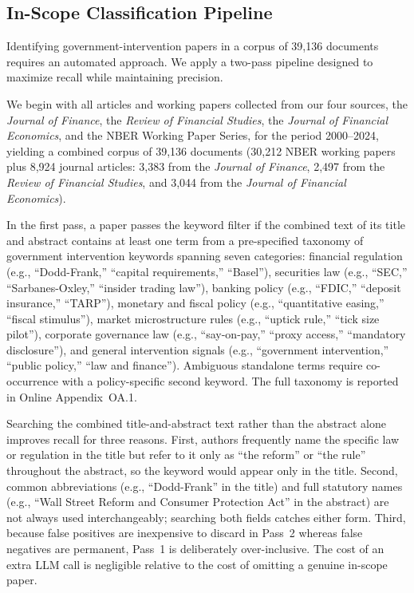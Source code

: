\documentclass[12pt]{article}
\newcommand{\JF}{\textit{Journal of Finance}}
\newcommand{\RFS}{\textit{Review of Financial Studies}}
\newcommand{\JFE}{\textit{Journal of Financial Economics}}
\begin{document}
\subsection{In-Scope Classification Pipeline}
\label{subsec:inscope}

Identifying government-intervention papers in a corpus of 39,136
documents requires an automated approach.  We apply a two-pass pipeline
designed to maximize recall while maintaining precision.

We begin with all articles and working papers collected from our four
sources, the \JF{}, the \RFS{}, the \JFE{}, and the NBER Working Paper
Series, for the period 2000--2024, yielding a combined corpus of 39,136
documents (30,212 NBER working papers plus 8,924 journal articles: 3,383 from
the \JF{}, 2,497 from the \RFS{}, and 3,044 from the \JFE{}).

In the first pass, a paper passes the keyword filter if the combined text of its title and abstract
contains at least one term from a pre-specified taxonomy of government intervention keywords spanning
seven categories: financial regulation (e.g., ``Dodd-Frank,'' ``capital
requirements,'' ``Basel''), securities law (e.g., ``SEC,'' ``Sarbanes-Oxley,''
``insider trading law''), banking policy (e.g., ``FDIC,'' ``deposit
insurance,'' ``TARP''), monetary and fiscal policy (e.g., ``quantitative
easing,'' ``fiscal stimulus''), market microstructure rules (e.g., ``uptick rule,''
``tick size pilot''), corporate governance law (e.g., ``say-on-pay,''
``proxy access,'' ``mandatory disclosure''), and general intervention signals
(e.g., ``government intervention,'' ``public policy,'' ``law and finance'').  Ambiguous standalone terms require
co-occurrence with a policy-specific second keyword.  The full taxonomy is
reported in Online Appendix~OA.1.

Searching the combined title-and-abstract text rather than the abstract alone
improves recall for three reasons.  First, authors frequently name the specific
law or regulation in the title but refer to it only as ``the reform'' or ``the
rule'' throughout the abstract, so the keyword would appear only in the title.
Second, common abbreviations (e.g., ``Dodd-Frank'' in the title) and full
statutory names (e.g., ``Wall Street Reform and Consumer Protection Act'' in the
abstract) are not always used interchangeably; searching both fields catches
either form.  Third, because false positives are inexpensive to
discard in Pass~2 whereas false negatives are permanent, Pass~1 is deliberately
over-inclusive.  The cost of an extra LLM call is negligible relative to the cost
of omitting a genuine in-scope paper.
\end{document}
